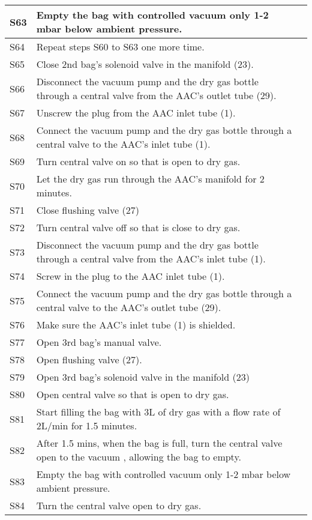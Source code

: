 \begin{longtable} {|m{}|m{}|m{}|}
S63 & Empty the bag with controlled vacuum only 1-2 mbar below ambient pressure. & \\ \hline
S64 & Repeat steps S60 to S63 one more time. & \\ \hline
S65 & Close 2nd bag's solenoid valve in the manifold (23). & \\ \hline
S66 & Disconnect the vacuum pump and the dry gas bottle through a central valve from the AAC's outlet tube (29). & \\ \hline
S67 & Unscrew the plug from the AAC inlet tube (1). & \\ \hline
S68 & Connect the vacuum pump and the dry gas bottle through a central valve to the AAC's inlet tube (1). & \\ \hline
S69 & Turn central valve on so that is open to dry gas. & \\ \hline
S70 & Let the dry gas run through the AAC's manifold for 2 minutes. & \\ \hline
S71 & Close flushing valve (27) & \\ \hline
S72 & Turn central valve off so that is close to dry gas. & \\ \hline
S73 & Disconnect the vacuum pump and the dry gas bottle through a central valve from the AAC's inlet tube (1). & \\ \hline
S74 & Screw in the plug to the AAC inlet tube (1). & \\ \hline
S75 & Connect the vacuum pump and the dry gas bottle through a central valve to the AAC's outlet tube (29). & \\ \hline
S76 & Make sure the AAC's inlet tube (1) is shielded. & \\ \hline
S77 & Open 3rd bag's manual valve. & \\ \hline
S78 & Open flushing valve (27). & \\ \hline
S79 & Open 3rd bag's solenoid valve in the manifold (23) & \\ \hline
S80 & Open central valve so that is open to dry gas. & \\ \hline
S81 & Start filling the bag with 3L of dry gas with a flow rate of 2L/min for 1.5 minutes. & \\ \hline
S82 & After 1.5 mins, when the bag is full, turn the central valve open to the vacuum , allowing the bag to empty. & \\ \hline
S83 & Empty the bag with controlled vacuum only 1-2 mbar below ambient pressure. & \\ \hline
S84 & Turn the central valve open to dry gas. & \\ \hline

\end{longtable}
